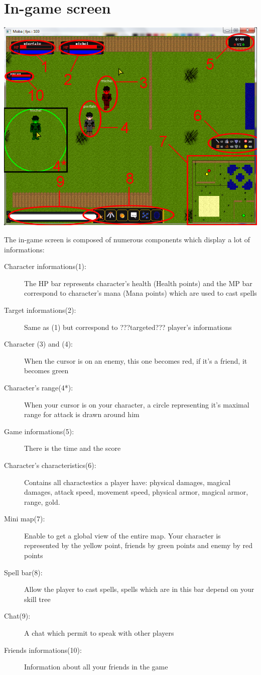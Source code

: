 \documentclass{scrreprt}
\begin{document}
		  \section{In-game screen}
		  \begin{center}
		  \includegraphics[scale=0.4]{in_game.png}
		  \end{center}
		  The in-game screen is composed of numerous components which display a lot of informations:
		  \begin{description}
		  \item[Character informations(1):]{The HP bar represents character's health (Health points) and the MP bar correspond to character's mana (Mana points) which are used to cast spells}
		  \item[Target informations(2):]{Same as (1) but correspond to ???targeted??? player's informations}
		  \item[Character (3) and (4):]{When the cursor is on an enemy, this one becomes red, if it's a friend, it becomes green}
		  \item[Character's range(4*):]{When your cursor is on your character, a circle representing it's maximal range for attack is drawn around him}
		  \item[Game informations(5):]{There is the time and the score}
		  \item[Character's characteristics(6):]{Contains all charactestics a player have: physical damages, magical damages, attack speed, movement speed, physical armor, magical armor, range, gold.}
		  \item[Mini map(7):]{Enable to get a global view of the entire map. Your character is represented by the yellow point, friends by green points and enemy by red points}
		  \item[Spell bar(8):]{Allow the player to cast spells, spells which are in this bar depend on your skill tree}
		  \item[Chat(9):]{A chat which permit to speak with other players}
		  \item[Friends informations(10):]{Information about all your friends in the game}
		  \end{description}
\end{document}
